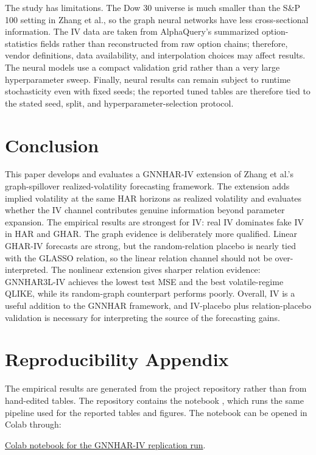 \documentclass[11pt,a4paper]{article}
\begin{document}
The study has limitations. The Dow 30 universe is much smaller than the S\&P 100 setting in
Zhang et al., so the graph neural networks have less cross-sectional information. The IV data
are taken from AlphaQuery's summarized option-statistics fields rather than reconstructed from
raw option chains; therefore, vendor definitions, data availability, and interpolation choices
may affect results. The neural models use a compact validation grid rather than a very large
hyperparameter sweep. Finally, neural results can remain subject to runtime stochasticity even
with fixed seeds; the reported tuned tables are therefore tied to the stated seed, split, and
hyperparameter-selection protocol.

\section{Conclusion}

This paper develops and evaluates a GNNHAR-IV extension of Zhang et al.'s graph-spillover
realized-volatility forecasting framework. The extension adds implied volatility at the same HAR
horizons as realized volatility and evaluates whether the IV channel contributes genuine
information beyond parameter expansion. The empirical results are strongest for IV: real IV
dominates fake IV in HAR and GHAR. The graph evidence is deliberately more qualified.
Linear GHAR-IV forecasts are strong, but the random-relation placebo is nearly tied with the
GLASSO relation, so the linear relation channel should not be over-interpreted. The nonlinear
extension gives sharper relation evidence: GNNHAR3L-IV achieves the lowest test MSE and the
best volatile-regime QLIKE, while its random-graph counterpart performs poorly. Overall, IV is
a useful addition to the GNNHAR framework, and IV-placebo plus relation-placebo validation is
necessary for interpreting the source of the forecasting gains.

\appendix
\section{Reproducibility Appendix}
\label{app:colab}

The empirical results are generated from the project repository rather than from hand-edited
tables. The repository contains the notebook
, which runs the same pipeline used for the
reported tables and figures. The notebook can be opened in Colab through:

\noindent\href{https://colab.research.google.com/github/easygl1der/GNNHAR/blob/2026-06-01/notebooks/gnnhar_iv_colab_full_run.ipynb}{Colab notebook for the GNNHAR-IV replication run}.
\end{document}
